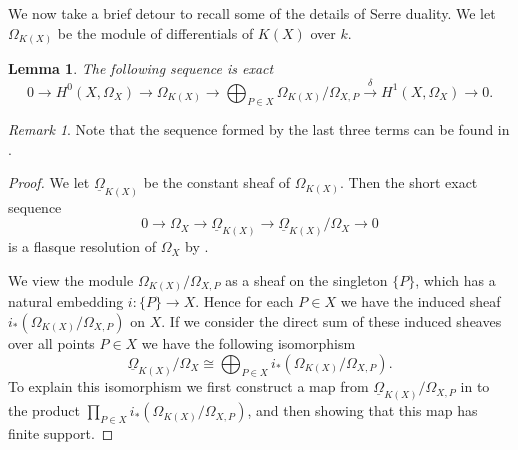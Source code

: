 \documentclass[draft, 11pt]{article} %
\theoremstyle{plain}
\newtheorem{lem}[defn]{Lemma}
\theoremstyle{remark}
\newtheorem*{rem}{Remark}
\newcommand{\ra}{\rightarrow}
\newcommand{\hzero}{{H^0(X,\Omega_X)}}
\begin{document}
We now take a brief detour to recall some of the details of Serre duality.
We let $\Omega_{K(X)}$ be the module of differentials of $K(X)$ over $k$.
\begin{lem}
The following sequence is exact
\begin{equation}\label{dualityses}
0 \rightarrow \hzero \ra \Omega_{K(X)} \ra \bigoplus_{P \in X}\Omega_{K(X)}/\Omega_{X,P} \xrightarrow{\delta} H^1(X,\Omega_X) \ra 0.
\end{equation}
\end{lem}
\begin{rem}
Note that the sequence formed by the last three terms can be found in \cite[Pg. 248]{hart}.
\end{rem}
\begin{proof}
We let $\underline{\Omega}_{K(X)}$ be the constant sheaf of $\Omega_{K(X)}$.
Then the short exact sequence
\begin{equation}\label{serredualityses}
0 \rightarrow \Omega_X \rightarrow \underline{\Omega}_{K(X)} \rightarrow \underline{\Omega}_{K(X)}/\Omega_X \rightarrow 0
\end{equation}
is a flasque resolution of $\Omega_X$ by \cite[Chap II, ex. 1.16]{hart}.

We view the module $\Omega_{K(X)}/\Omega_{X,P}$ as a sheaf on the singleton $\{P\}$, which has a natural embedding $i\colon \{P\} \rightarrow X$.
Hence for each $P\in X$ we have the induced sheaf $i_*\left(\Omega_{K(X)}/\Omega_{X,P}\right)$ on $X$.
If we consider the direct sum of these induced sheaves over all points $P\in X$ we have the following isomorphism
\begin{equation}\label{sheafisomorphism}
\underline{\Omega}_{K(X)}/\Omega_X\cong \bigoplus_{P\in X} i_*\left(\Omega_{K(X)}/\Omega_{X,P}\right).
\end{equation}
To explain this isomorphism we first construct a map from $\underline{\Omega}_{K(X)}/\Omega_{X,P}$ in to the product $\prod_{P \in X} i_*\left(\Omega_{K(X)}/\Omega_{X,P}\right)$, and then showing that this map has finite support.


\end{proof}
\end{document}
